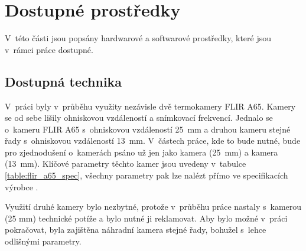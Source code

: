 \section{Dostupné prostředky}
V~této části jsou popsány hardwarové a softwarové prostředky, které jsou v~rámci práce dostupné.

	\subsection{Dostupná technika}\label{sec:used_equip}
 	V~práci byly v~průběhu využity nezávisle dvě termokamery FLIR A65. Kamery se od sebe lišily ohniskovou vzdáleností a snímkovací frekvencí. Jednalo se o~kameru FLIR A65 s~ohniskovou vzdáleností 25~mm a druhou kameru stejné řady s~ohniskovou vzdáleností 13~mm. V~částech práce, kde to bude nutné, bude pro zjednodušení o~kamerách psáno už jen jako kamera (25~mm) a kamera (13~mm). Klíčové parametry těchto kamer jsou uvedeny v~tabulce \ref{table:flir_a65_spec}, všechny parametry pak lze nalézt přímo ve specifikacích výrobce \cite{flirA65Spec}.

    Využití druhé kamery bylo nezbytné, protože v~průběhu práce nastaly s~kamerou (25 mm) technické potíže a bylo nutné ji reklamovat. Aby bylo možné v~práci pokračovat, byla zajištěna náhradní kamera stejné řady, bohužel s~lehce odlišnými parametry. 
  
